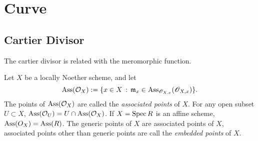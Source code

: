 \chapter{Curve}

\section{Cartier Divisor}

The cartier divisor is related with the meromorphic function.

\begin{defi}
Let $X$ be a locally Noether scheme, and let
\[
	\operatorname{Ass}(\mathcal O_X) := \{ x\in X\,:\,
		\mathfrak m_x\in \operatorname{Ass}_{\mathscr O_{X,x}}(\mathscr O_{X,x})
	\}.
\]
The points of $\operatorname{Ass}(\mathcal O_X)$ are called the \textit{associated points} 
of $X$. For any open subset $U\subset X$, $\operatorname{Ass}(\mathcal O_U)=U\cap \operatorname{Ass}(\mathcal O_X)$.
If $X=\operatorname{Spec} R$ is an affine scheme, $\operatorname{Ass}(O_X)=\operatorname{Ass}(R)$.
The generic points of $X$ are associated points of $X$, associated points other than
generic points are call the \textit{embedded points} of $X$.
\end{defi} 



